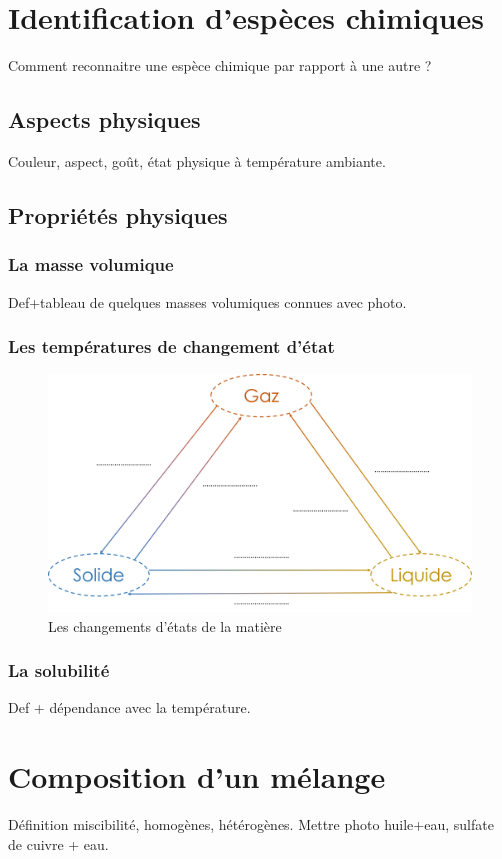 \section{Identification d'espèces chimiques}
Comment reconnaitre une espèce chimique par rapport à une autre ? 

\subsection{Aspects physiques}
Couleur, aspect, goût, état physique à température ambiante.
\subsection{Propriétés physiques}
\subsubsection{La masse volumique}
Def+tableau de quelques masses volumiques connues avec photo.
\subsubsection{Les températures de changement d'état}

\begin{figure}[!htb]
    \centering
    \includegraphics[scale=0.5]{Cours/Changement_etat.png}
    \caption{Les changements d'états de la matière}
    \label{fig:enter-label}
\end{figure}
\subsubsection{La solubilité}
Def + dépendance avec la température.

\section{Composition d'un mélange}
Définition miscibilité, homogènes, hétérogènes. Mettre photo huile+eau, sulfate de cuivre + eau.